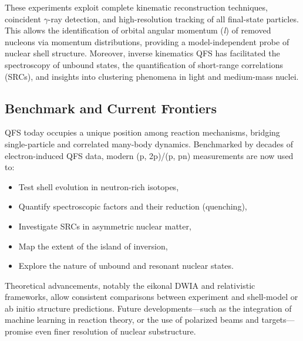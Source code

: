 These experiments exploit complete kinematic reconstruction techniques, coincident $\gamma$-ray detection, and high-resolution tracking of all final-state particles. This allows the identification of orbital angular momentum (\emph{l}) of removed nucleons via momentum distributions, providing a model-independent probe of nuclear shell structure. Moreover, inverse kinematics \gls{QFS} has facilitated the spectroscopy of unbound states, the quantification of short-range correlations (SRCs), and insights into clustering phenomena in light and medium-mass nuclei.


\subsection{Benchmark and Current Frontiers}

\gls{QFS} today occupies a unique position among reaction mechanisms, bridging single-particle and correlated many-body dynamics. Benchmarked by decades of electron-induced \gls{QFS} data, modern (p, 2p)/(p, pn) measurements are now used to:

\begin{itemize}
	\item Test shell evolution in neutron-rich isotopes,
	\item Quantify spectroscopic factors and their reduction (quenching),
	\item Investigate SRCs in asymmetric nuclear matter,
	\item Map the extent of the island of inversion,
	\item Explore the nature of unbound and resonant nuclear states.
\end{itemize}

Theoretical advancements, notably the eikonal DWIA and relativistic frameworks, allow consistent comparisons between experiment and shell-model or ab initio structure predictions. Future developments—such as the integration of machine learning in reaction theory, or the use of polarized beams and targets—promise even finer resolution of nuclear substructure.


%



